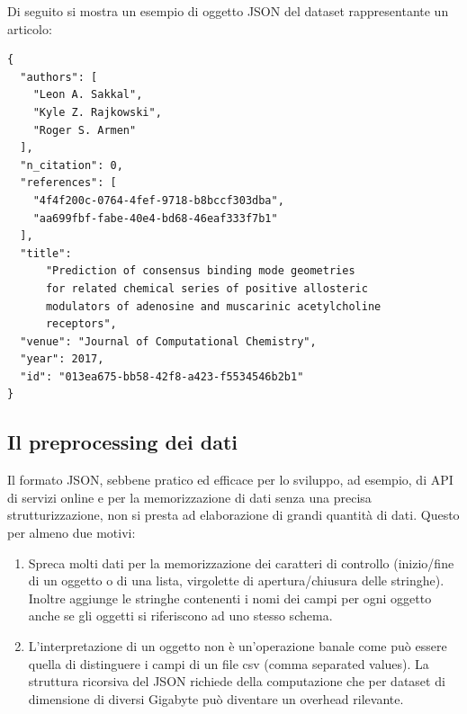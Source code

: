 \documentclass[a4paper,12pt]{article}
\begin{document}
Di seguito si mostra un esempio di oggetto JSON del dataset rappresentante un articolo:
\begin{lstlisting}[keepspaces=true]
{
  "authors": [
    "Leon A. Sakkal",
    "Kyle Z. Rajkowski",
    "Roger S. Armen"
  ],
  "n_citation": 0,
  "references": [
    "4f4f200c-0764-4fef-9718-b8bccf303dba",
    "aa699fbf-fabe-40e4-bd68-46eaf333f7b1"
  ],
  "title":
      "Prediction of consensus binding mode geometries
      for related chemical series of positive allosteric
      modulators of adenosine and muscarinic acetylcholine
      receptors",
  "venue": "Journal of Computational Chemistry",
  "year": 2017,
  "id": "013ea675-bb58-42f8-a423-f5534546b2b1"
}
\end{lstlisting}
\subsection{Il preprocessing dei dati}
Il formato JSON, sebbene pratico ed efficace per lo sviluppo, ad esempio, di API di servizi online e per la memorizzazione di dati senza una precisa strutturizzazione, non si presta ad elaborazione di grandi quantità di dati. Questo per almeno due motivi:
\begin{enumerate}  
  \item Spreca molti dati per la memorizzazione dei caratteri di controllo (inizio/fine di un oggetto o di una lista, virgolette di apertura/chiusura delle stringhe). Inoltre aggiunge le stringhe contenenti i nomi dei campi per ogni oggetto anche se gli oggetti si riferiscono ad uno stesso schema.
  \item L'interpretazione di un oggetto non è un'operazione banale come può essere quella di distinguere i campi di un file csv (comma separated values). La struttura ricorsiva del JSON richiede della computazione che per dataset di dimensione di diversi Gigabyte può diventare un overhead rilevante.
\end{enumerate}
\end{document}
